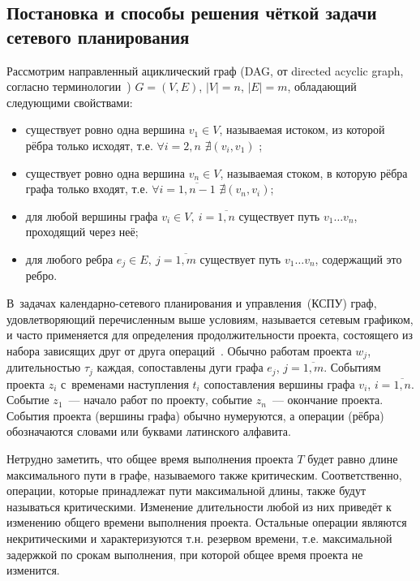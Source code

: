 \subsection{Постановка и способы решения чёткой задачи сетевого планирования}

Рассмотрим направленный ациклический граф (DAG, от directed acyclic graph, согласно терминологии~\cite{Kormen}) $G=(V,E)$, $\left| V \right|=n$, $\left| E \right|=m$, обладающий следующими свойствами:
\begin{itemize}
  \item существует ровно одна вершина $v_1\in V$, называемая истоком, из которой рёбра только исходят, т.е. $\forall i=2,n$ $\nexists \left( v_i, v_1 \right)$ ;
  \item существует ровно одна вершина $v_n\in V$, называемая стоком, в которую рёбра графа только входят, т.е.  $\forall i=\overline{1,n-1}$ $\nexists \left( v_n, v_i \right)$;
  \item для любой вершины графа $v_i\in V,\ i=\overline{1,n}$ существует путь $v_1\ldots v_n$, проходящий через неё;
  \item для любого ребра $e_j\in E,\ j=\overline{1,m}$ существует путь $v_1\ldots v_n$, содержащий это ребро.
\end{itemize}

В~задачах календарно-сетевого планирования и управления~(КСПУ) граф, удовлетворяющий перечисленным выше условиям, называется сетевым графиком, и часто применяется для определения продолжительности проекта, состоящего из набора зависящих друг от друга операций~\cite{Kosorukov_Mischenko, Eddous, Taha_Operation_Research, Balashov_IPU}. Обычно работам проекта $w_j$, длительностью $\tau_j$ каждая, сопоставлены дуги графа $e_j$, $j=\overline{1,m}$. Событиям проекта $z_i$ с~временами наступления $t_i$ сопоставления вершины графа $v_i$, $i=\overline{1,n}$. Событие $z_1$~--- начало работ по проекту, событие $z_n$~--- окончание проекта. События проекта (вершины графа) обычно нумеруются, а операции (рёбра) обозначаются словами или буквами латинского алфавита.

Нетрудно заметить, что общее время выполнения проекта $T$ будет равно длине максимального пути в графе, называемого также критическим. Соответственно, операции, которые принадлежат пути максимальной длины, также будут называться критическими. Изменение длительности любой из них приведёт к изменению общего времени выполнения проекта. Остальные операции являются некритическими и характеризуются т.н. резервом времени, т.е. максимальной задержкой по срокам выполнения, при которой общее время проекта не изменится.

